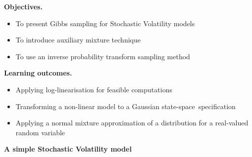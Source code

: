 \documentclass[notes,blackandwhite,mathsans,usenames,dvipsnames]{beamer}
\begin{document}
\begin{frame}

\bigskip\textbf{\color{mcxs1}Objectives.}
\begin{itemize}[label=$\blacktriangleright$]
\item {\color{mcxs1}To present Gibbs sampling for Stochastic Volatility models}
\item {\color{mcxs1}To introduce auxiliary mixture technique }
\item {\color{mcxs1}To use an inverse probability transform sampling method}
\end{itemize}

\bigskip\textbf{\color{purple}Learning outcomes.}
\begin{itemize}[label=$\blacktriangleright$]
\item {\color{purple}Applying log-linearisation for feasible computations }
\item {\color{purple}Transforming a non-linear model to a Gaussian state-space~specification}
\item {\color{purple}Applying a normal mixture approximation of a distribution for a real-valued random variable }
\end{itemize}

\end{frame}






{
\begin{frame}

\begin{adjustwidth}{-0.5cm}{0cm}
\FlushLeft
\vspace{8.3cm}\Large
\textbf{{\color{mcxs2}A simple} {\color{purple}Stochastic Volatility model}}
\end{adjustwidth}

\end{frame}
}
\end{document}
